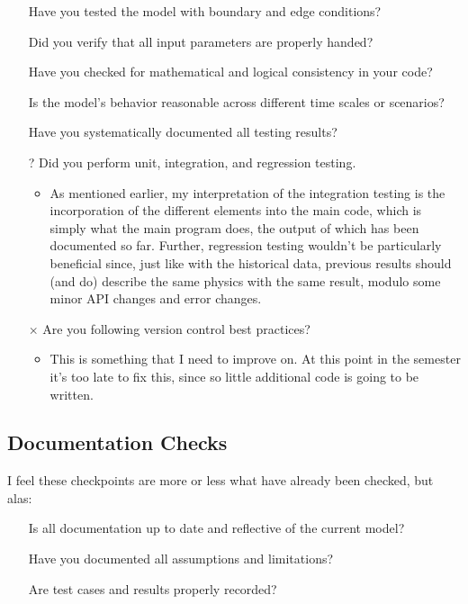 \begin{itemize}
\item[\checkmark] Have you tested the model with boundary and edge conditions?
\item[\checkmark] Did you verify that all input parameters are properly handed?
\item[\checkmark] Have you checked for mathematical and logical consistency in your code?
\item[\checkmark] Is the model's behavior reasonable across different time scales or scenarios?
\item[\checkmark] Have you systematically documented all testing results?
\item[?] Did you perform unit, integration, and regression testing.
  \begin{itemize}
  \item As mentioned earlier, my interpretation of the integration testing is the incorporation of the different elements into the main code, which is simply what the main program does, the output of which has been documented so far. Further, regression testing wouldn't be particularly beneficial since, just like with the historical data, previous results should (and do) describe the same physics with the same result, modulo some minor API changes and error changes.
  \end{itemize}
\item[$\times$] Are you following version control best practices?
  \begin{itemize}
  \item This is something that I need to improve on. At this point in the semester it's too late to fix this, since so little additional code is going to be written. 
  \end{itemize}
\end{itemize}


\subsection{Documentation Checks}

I feel these checkpoints are more or less what have already been checked, but alas:

\begin{itemize}
\item[\checkmark] Is all documentation up to date and reflective of the current model?
\item[\checkmark] Have you documented all assumptions and limitations?
\item[\checkmark] Are test cases and results properly recorded?
\end{itemize}



